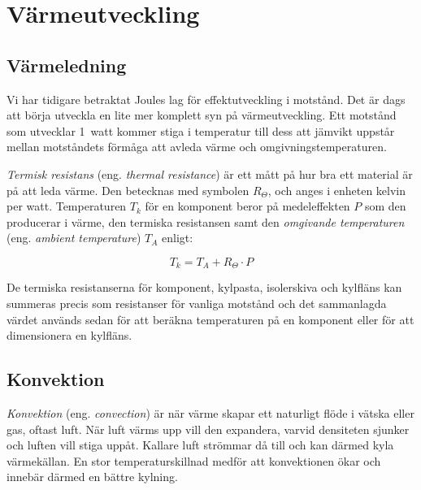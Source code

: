\section{Värmeutveckling}



\subsection{Värmeledning}



Vi har tidigare betraktat Joules lag för effektutveckling i motstånd.
Det är dags att börja utveckla en lite mer komplett syn på värmeutveckling.
Ett motstånd som utvecklar 1~watt kommer stiga i temperatur till dess att
jämvikt uppstår mellan motståndets förmåga att avleda värme och
omgivningstemperaturen.

\emph{Termisk resistans} (eng. \emph{thermal resistance}) är ett mått på
hur bra ett material är på att leda värme. Den betecknas med symbolen \(R_\Theta\),
och anges i enheten kelvin per watt.
Temperaturen \(T_k\) för en komponent beror på medeleffekten \(P\) som den
producerar i värme, den termiska resistansen samt den \emph{omgivande temperaturen}
(eng. \emph{ambient temperature}) \(T_A\) enligt:

\[T_k = T_A + R_\Theta \cdot P\]

De termiska resistanserna för komponent, kylpasta, isolerskiva och kylfläns
kan summeras precis som resistanser för vanliga motstånd och det
sammanlagda värdet används sedan för att beräkna temperaturen på en
komponent eller för att dimensionera en kylfläns.

\subsection{Konvektion}

\emph{Konvektion} (eng. \emph{convection}) är när värme skapar ett naturligt
flöde i vätska eller gas, oftast luft. När luft värms upp vill den expandera,
varvid densiteten sjunker och luften vill stiga uppåt. Kallare luft strömmar då
till och kan därmed kyla värmekällan. En stor temperaturskillnad medför att
konvektionen ökar och innebär därmed en bättre kylning.

